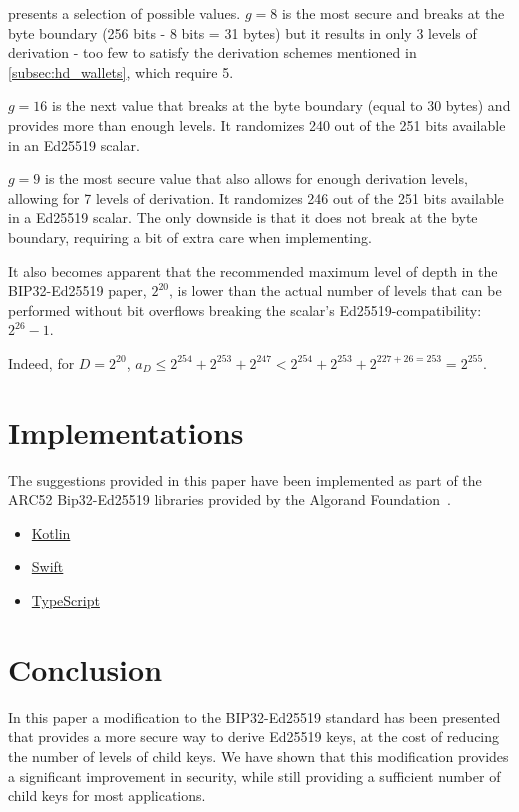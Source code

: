 \documentclass[12pt, a4paper, twocolumn]{article}
\begin{document}
 presents a selection of possible values.
$g=8$ is the most secure and breaks at the byte boundary (256 bits - 8 bits = 31 bytes) but it results in only 3 levels of derivation - too few to satisfy the derivation schemes mentioned in \cref{subsec:hd_wallets}, which require 5.

$g=16$ is the next value that breaks at the byte boundary (equal to 30 bytes) and provides more than enough levels. It randomizes 240 out of the 251 bits available in an Ed25519 scalar.

$g=9$ is the most secure value that also allows for enough derivation levels, allowing for 7 levels of derivation. It randomizes 246 out of the 251 bits available in a Ed25519 scalar. The only downside is that it does not break at the byte boundary, requiring a bit of extra care when implementing.

It also becomes apparent that the recommended maximum level of depth in the BIP32-Ed25519 paper, $2^{20}$, is lower than the actual number of levels that can be performed without bit overflows breaking the scalar's Ed25519-compatibility: $2^{26} - 1$.

Indeed, for $D=2^{20}$, $a_{D} \leq 2^{254} + 2^{253} + 2^{247} < 2^{254} + 2^{253} + 2^{227+26=253} = 2^{255}$.


\section{Implementations}


The suggestions provided in this paper have been implemented as part of the ARC52 Bip32-Ed25519 libraries provided by the Algorand Foundation~\cite{AF}.

\begin{itemize}
  \item \href{https://github.com/algorandfoundation/bip32-ed25519-kotlin}{Kotlin}
  \item \href{https://github.com/algorandfoundation/bip32-ed25519-swift}{Swift}
  \item \href{https://github.com/ehanoc/ARCs/tree/wallet-api-context/assets/arc-0052}{TypeScript}
\end{itemize}


\section{Conclusion}

In this paper a modification to the BIP32-Ed25519 standard has been presented that provides a more secure way to derive Ed25519 keys, at the cost of reducing the number of levels of child keys. We have shown that this modification provides a significant improvement in security, while still providing a sufficient number of child keys for most applications.
\end{document}
